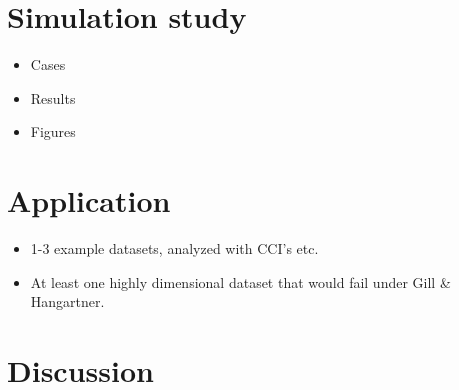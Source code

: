 \documentclass[12pt,a4paper]{article}\usepackage[]{graphicx}\usepackage[]{color}
\begin{document}
%
%
%
%

\section{Simulation study}

\begin{itemize}
\item Cases
\item Results
\item Figures
\end{itemize}

\section{Application}

\begin{itemize}
\item 1-3 example datasets, analyzed with CCI's etc.
\item At least one highly dimensional dataset that would fail under Gill \& Hangartner.
\end{itemize}


\section{Discussion}
\end{document}
